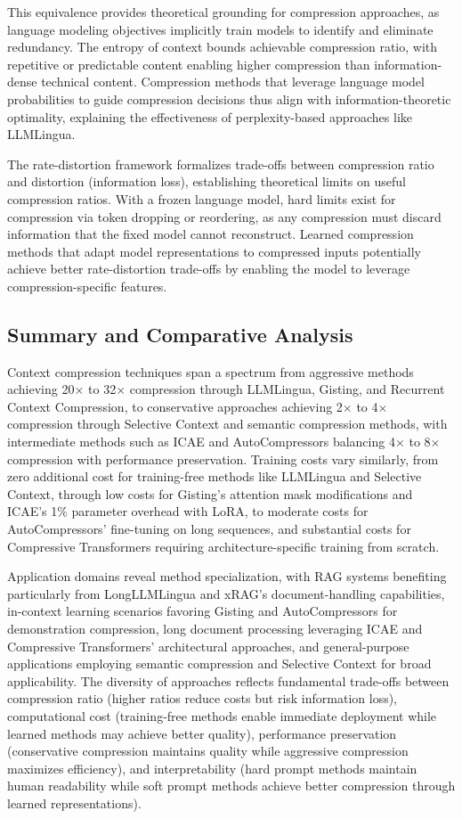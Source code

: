 \documentclass[11pt,letterpaper]{article}
\begin{document}
This equivalence provides theoretical grounding for compression approaches, as language modeling objectives implicitly train models to identify and eliminate redundancy. The entropy of context bounds achievable compression ratio, with repetitive or predictable content enabling higher compression than information-dense technical content. Compression methods that leverage language model probabilities to guide compression decisions thus align with information-theoretic optimality, explaining the effectiveness of perplexity-based approaches like LLMLingua.

The rate-distortion framework formalizes trade-offs between compression ratio and distortion (information loss), establishing theoretical limits on useful compression ratios. With a frozen language model, hard limits exist for compression via token dropping or reordering, as any compression must discard information that the fixed model cannot reconstruct. Learned compression methods that adapt model representations to compressed inputs potentially achieve better rate-distortion trade-offs by enabling the model to leverage compression-specific features.

\subsection{Summary and Comparative Analysis}

Context compression techniques span a spectrum from aggressive methods achieving 20$\times$ to 32$\times$ compression through LLMLingua, Gisting, and Recurrent Context Compression, to conservative approaches achieving 2$\times$ to 4$\times$ compression through Selective Context and semantic compression methods, with intermediate methods such as ICAE and AutoCompressors balancing 4$\times$ to 8$\times$ compression with performance preservation. Training costs vary similarly, from zero additional cost for training-free methods like LLMLingua and Selective Context, through low costs for Gisting's attention mask modifications and ICAE's 1\% parameter overhead with LoRA, to moderate costs for AutoCompressors' fine-tuning on long sequences, and substantial costs for Compressive Transformers requiring architecture-specific training from scratch.

Application domains reveal method specialization, with RAG systems benefiting particularly from LongLLMLingua and xRAG's document-handling capabilities, in-context learning scenarios favoring Gisting and AutoCompressors for demonstration compression, long document processing leveraging ICAE and Compressive Transformers' architectural approaches, and general-purpose applications employing semantic compression and Selective Context for broad applicability. The diversity of approaches reflects fundamental trade-offs between compression ratio (higher ratios reduce costs but risk information loss), computational cost (training-free methods enable immediate deployment while learned methods may achieve better quality), performance preservation (conservative compression maintains quality while aggressive compression maximizes efficiency), and interpretability (hard prompt methods maintain human readability while soft prompt methods achieve better compression through learned representations).
\end{document}
